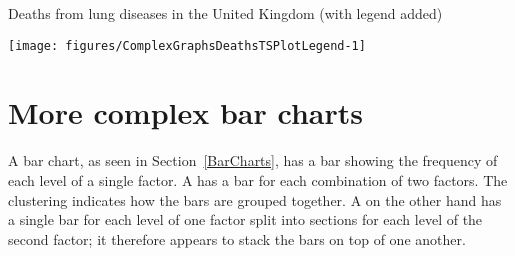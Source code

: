 \begin{exhibit} 
\begin{center} 
\caption{Deaths from lung diseases in the United Kingdom (with legend added)} 
\label{LungsLegend} 
\begin{knitrout}
\color{fgcolor}\begin{kframe}
\begin{alltt}
\hlstd{> } \hlstd{=}\hlstd{(}\hlstd{,}\hlstd{),} \hlstd{=}\hlstd{,} \hlstd{=}\hlstd{)}
\hlstd{> } \hlstd{=}\hlstd{)}
\hlstd{> } \hlstd{=}\hlstd{)}
\hlstd{> }\hlstd{(}\hlstd{,} \hlstd{=}\hlstd{(}\hlstd{,} \hlstd{,} \hlstd{),} \hlstd{=}\hlstd{(}\hlstd{,} \hlstd{,} \hlstd{),} \hlstd{=}\hlstd{(}\hlstd{,}\hlstd{,}\hlstd{))}
\end{alltt}
\end{kframe}
\texttt{[image: figures/ComplexGraphsDeathsTSPlotLegend-1]} 

\end{knitrout}
\end{center} 
\end{exhibit} 
 
\section{More complex bar charts} 
 
A bar chart, as seen in Section~\ref{BarCharts}, has a bar showing the frequency of each level of a single factor. A  has a bar for each combination of two factors. The clustering indicates how the bars are grouped together. A  on the other hand has a single bar for each level of one factor split into sections for each level of the second factor; it therefore appears to stack the bars on top of one another. 
 
